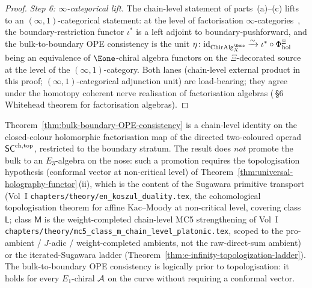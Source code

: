 \begin{proof}
\emph{Step 6: $\infty$-categorical lift.}
The chain-level statement of parts~(a)--(c) lifts to an
$(\infty,1)$-categorical statement: at the level of factorisation
$\infty$-categories~\cite{AF15,FG12}, the
boundary-restriction functor $\iota^*$ is a left
adjoint to boundary-pushforward, and the bulk-to-boundary OPE
consistency is the unit $\eta\colon \id_{\mathrm{ChirAlg}_X^{\Eone}}
\xrightarrow{\sim} \iota^* \circ \Phi_{\mathrm{hol}}^\Xi$ being an
equivalence of $\Eone$-chiral algebra functors on the
\(\Xi\)-decorated source at the level of the $(\infty,1)$-category.
Both lanes (chain-level external product
in this proof; $(\infty,1)$-categorical adjunction unit) are
load-bearing; they agree under
the homotopy coherent nerve realisation of factorisation algebras
(\cite{CG21}\,\S6 Whitehead theorem for factorisation algebras).
\end{proof}

\begin{remark}\label{rem:bulk-bdry-pattern-277-scope}%

Theorem~\ref{thm:bulk-boundary-OPE-consistency} is a chain-level
identity on the closed-colour holomorphic factorisation map of the
directed two-coloured operad $\mathsf{SC}^{\mathrm{ch},\mathrm{top}}$, restricted to the boundary
stratum.
The result does \emph{not} promote the bulk to an $E_3$-algebra on
the nose: such a promotion requires the topologisation hypothesis
(conformal vector at non-critical level) of
Theorem~\ref{thm:universal-holography-functor}\,(ii), which is the
content of the Sugawara primitive transport
(Vol~I \texttt{chapters/theory/en\_koszul\_duality.tex}, the
cohomological topologisation theorem for affine Kac--Moody at
non-critical level, covering class $\mathsf L$; class $\mathsf M$
is the weight-completed chain-level MC5 strengthening of Vol~I
\texttt{chapters/theory/mc5\_class\_m\_chain\_level\_platonic.tex},
scoped to the pro-ambient / $J$-adic / weight-completed ambients,
not the raw-direct-sum ambient) or the iterated-Sugawara
ladder (Theorem~\ref{thm:e-infinity-topologization-ladder}). The
bulk-to-boundary OPE consistency is logically prior to
topologisation: it holds for every $E_1$-chiral $\mathcal{A}$ on the curve
without requiring a conformal vector.
\end{remark}

